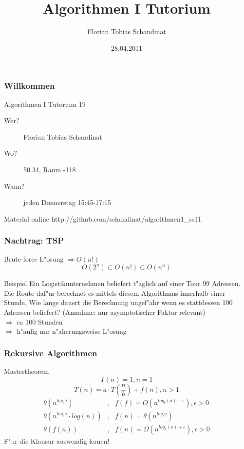 \documentclass{beamer}
\title{Algorithmen I Tutorium}
\author{Florian Tobias Schandinat}
\date{28.04.2011}
\institute{FTS}
\begin{document}
\begin{frame}
\frametitle{Willkommen}
\begin{block}{Algorithmen I Tutorium 19}
\begin{description}
\item[Wer?] Florian Tobias Schandinat\\
\item[Wo?] 50.34, Raum -118\\
\item[Wann?] jeden Donnerstag 15:45-17:15
\end{description}
\end{block}

\begin{block}{Material online}
http://github.com/schandinat/algorithmen1\_ss11
\end{block}
\end{frame}


\begin{frame}
\frametitle{Nachtrag: TSP}
\begin{block}{Brute-force L"osung}
\pause
$\Rightarrow O(n!)$
$$O(2^n) \subset O(n!) \subset O(n^n)$$
\end{block}

\pause

\begin{exampleblock}{Beispiel}
Ein Logistikunternehmen beliefert t"aglich auf einer Tour 99 Adressen. Die Route daf"ur berechnet es mittels diesem Algorithmus innerhalb einer Stunde. Wie lange dauert die Berechnung ungef"ahr wenn es stattdessen 100 Adressen beliefert? (Annahme: nur asymptotischer Faktor relevant)\\
\pause
$\Rightarrow$ \alert{ca 100 Stunden}\\
$\Longrightarrow$ h"aufig nur n"aherungsweise L"osung
\end{exampleblock}
\end{frame}


\begin{frame}
\frametitle{Rekursive Algorithmen}
\begin{block}{Mastertheorem}
$$T(n) = 1, n = 1$$
$$T(n) = a \cdot T\left(\frac{n}{b}\right) + f(n), n > 1$$
\begin{eqnarray*}
\theta(n^{log_b a})&,& f(f) = O(n^{log_b(a)-\epsilon}), \epsilon > 0\\
\theta(n^{log_b a} \cdot log(n))&,& f(n) = \theta(n^{log_b a})\\
\theta(f(n))&,& f(n) = \Omega(n^{log_b (a)+\epsilon}), \epsilon > 0
\end{eqnarray*}
\pause
\alert{F"ur die Klausur auswendig lernen!}
\end{block}
\end{frame}
\end{document}

